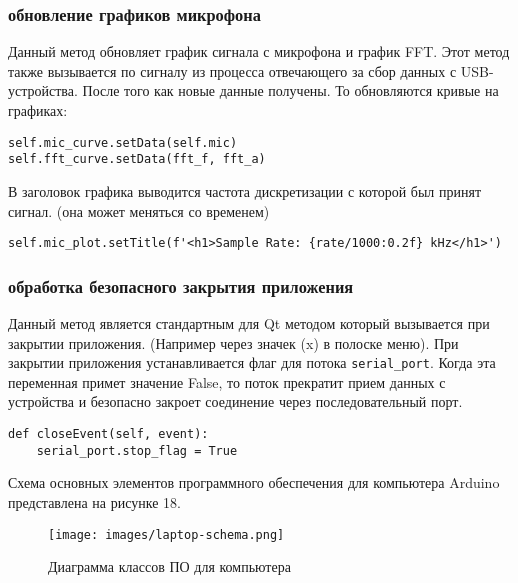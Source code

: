 \documentclass[../main.tex]{subfiles}
\begin{document}
\subsubsection{обновление графиков микрофона}
Данный метод обновляет график сигнала с микрофона и график FFT. Этот метод также вызывается по сигналу из процесса отвечающего за сбор данных с USB-устройства. После того как новые данные получены. То обновляются кривые на графиках:

\begin{lstlisting}
self.mic_curve.setData(self.mic)
self.fft_curve.setData(fft_f, fft_a)
\end{lstlisting}

В заголовок графика выводится частота дискретизации с которой был принят сигнал. (она может меняться со временем)
\begin{lstlisting}
self.mic_plot.setTitle(f'<h1>Sample Rate: {rate/1000:0.2f} kHz</h1>')
\end{lstlisting}

\subsubsection{обработка безопасного закрытия приложения}
Данный метод является стандартным для Qt методом который вызывается при закрытии приложения. (Например через значек (x) в полоске меню). При закрытии приложения устанавливается флаг для потока \verb|serial_port|. Когда эта переменная примет значение False, то поток прекратит прием данных с устройства и безопасно закроет соединение через последовательный порт.

\begin{lstlisting}
def closeEvent(self, event):
    serial_port.stop_flag = True
\end{lstlisting}

Схема основных элементов программного обеспечения для компьютера Arduino представлена на рисунке 18.

\begin{figure}[H]
\centering
\texttt{[image: images/laptop-schema.png]}
\caption{Диаграмма классов ПО для компьютера}
\end{figure}


\newpage
\end{document}
